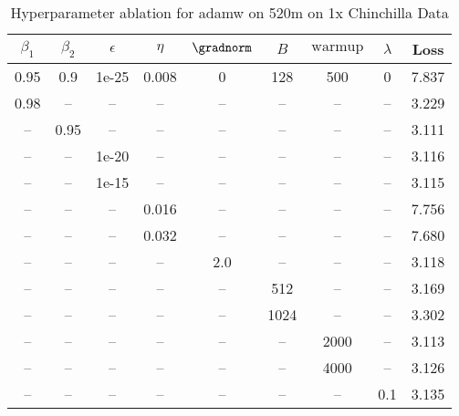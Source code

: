 \begin{table}[h!]
\centering
\caption{Hyperparameter ablation for adamw on 520m on 1x Chinchilla Data}
\label{tab:ablation_adamw_520m_on_1x_chinchilla_data}
\begin{tabular}{ccccccccc}
\toprule
$\beta_1$ & $\beta_2$ & $\epsilon$ & $\eta$ & $\gradnorm$ & $B$ & $\mathrm{warmup}$ & $\lambda$ & Loss \\
\midrule
0.95 & 0.9 & 1e-25 & 0.008 & 0 & 128 & 500 & 0 & 7.837 \\
\midrule
0.98 & -- & -- & -- & -- & -- & -- & -- & 3.229 \\
-- & 0.95 & -- & -- & -- & -- & -- & -- & 3.111 \\
-- & -- & 1e-20 & -- & -- & -- & -- & -- & 3.116 \\
-- & -- & 1e-15 & -- & -- & -- & -- & -- & 3.115 \\
-- & -- & -- & 0.016 & -- & -- & -- & -- & 7.756 \\
-- & -- & -- & 0.032 & -- & -- & -- & -- & 7.680 \\
-- & -- & -- & -- & 2.0 & -- & -- & -- & 3.118 \\
-- & -- & -- & -- & -- & 512 & -- & -- & 3.169 \\
-- & -- & -- & -- & -- & 1024 & -- & -- & 3.302 \\
-- & -- & -- & -- & -- & -- & 2000 & -- & 3.113 \\
-- & -- & -- & -- & -- & -- & 4000 & -- & 3.126 \\
-- & -- & -- & -- & -- & -- & -- & 0.1 & 3.135 \\
\bottomrule
\end{tabular}
\end{table}

